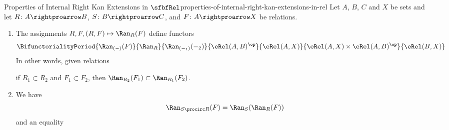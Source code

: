 \begin{proposition}{Properties of Internal Right Kan Extensions in $\sfbfRel$}{properties-of-internal-right-kan-extensions-in-rel}%
    Let $A$, $B$, $C$ and $X$ be sets and let $R\colon A\rightproarrow B$, $S\colon B\rightproarrow C$, and $F\colon A\rightproarrow X$ be relations.
    \begin{enumerate}
        \item\label{properties-of-internal-right-kan-extensions-in-rel-functoriality}The assignments $R,F,(R,F)\mapsto\Ran_{R}(F)$ define functors
            \[
                \BifunctorialityPeriod{\Ran_{(-)}(F)}{\Ran_{R}}{\Ran_{(-_{1})}(-_{2})}{\eRel(A,B)^{\op}}{\eRel(A,X)}{\eRel(A,X)\times\eRel(A,B)^{\op}}{\eRel(B,X)}%
            \]%
            In other words, given relations
            \begin{webcompile}
                \qquad
            \end{webcompile}
            if $R_{1}\subset R_{2}$ and $F_{1}\subset F_{2}$, then $\Ran_{R_{2}}(F_{1})\subset\Ran_{R_{1}}(F_{2})$.
        \item\label{properties-of-internal-right-kan-extensions-in-rel-interaction-with-composition}We have
            \[
                \Ran_{S\procirc R}(F)%
                =
                \Ran_{S}(\Ran_{R}(F))%
            \]%
            and an equality
            \begin{webcompile}
                \begin{tikzcd}[row sep={4.0*\the\DL,between origins}, column sep={4.0*\the\DL,between origins}, background color=backgroundColor, ampersand replacement=\&]

\end{tikzcd}
\end{webcompile}
\end{enumerate}
\end{proposition}
